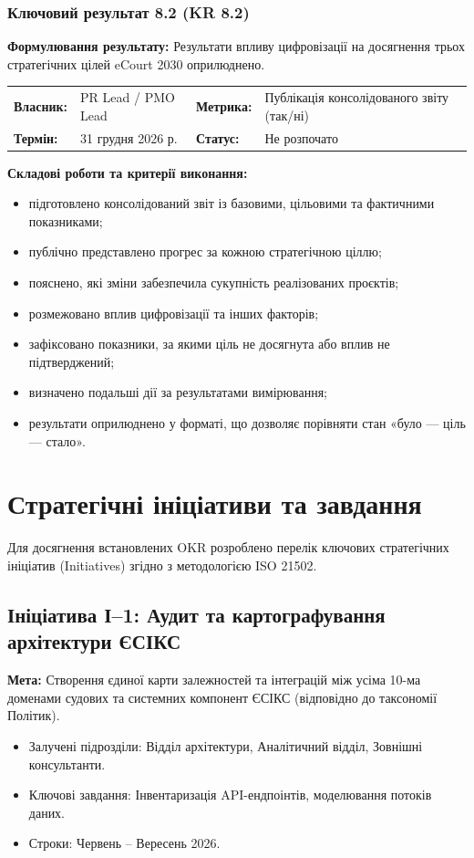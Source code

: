 \documentclass{article}
\begin{document}
\subsubsection{Ключовий результат 8.2 (KR 8.2)}

\textbf{Формулювання результату:} Результати впливу цифровізації на досягнення трьох стратегічних цілей eCourt 2030 оприлюднено.

\noindent\begin{tabular}{@{}p{2.2cm}p{4.5cm}p{2.2cm}p{4.5cm}@{}}
\toprule
\textbf{Власник:} & PR Lead / PMO Lead & \textbf{Метрика:} & Публікація консолідованого звіту (так/ні) \\
\textbf{Термін:} & 31 грудня 2026 р. & \textbf{Статус:} & Не розпочато \\
\bottomrule
\end{tabular}

\vspace{10pt}
\textbf{Складові роботи та критерії виконання:}
\begin{itemize}
    \item підготовлено консолідований звіт із базовими, цільовими та фактичними показниками;
    \item публічно представлено прогрес за кожною стратегічною ціллю;
    \item пояснено, які зміни забезпечила сукупність реалізованих проєктів;
    \item розмежовано вплив цифровізації та інших факторів;
    \item зафіксовано показники, за якими ціль не досягнута або вплив не підтверджений;
    \item визначено подальші дії за результатами вимірювання;
    \item результати оприлюднено у форматі, що дозволяє порівняти стан «було — ціль — стало».
\end{itemize}

\newpage
\section{Стратегічні ініціативи та завдання}
Для досягнення встановлених OKR розроблено перелік ключових стратегічних ініціатив (Initiatives) згідно з методологією ISO 21502.

\subsection{Ініціатива І--1: Аудит та картографування архітектури ЄСІКС}
\textbf{Мета:} Створення єдиної карти залежностей та інтеграцій між усіма 10-ма доменами судових та системних компонент ЄСІКС (відповідно до таксономії Політик).
\begin{itemize}
    \item Залучені підрозділи: Відділ архітектури, Аналітичний відділ, Зовнішні консультанти.
    \item Ключові завдання: Інвентаризація API-ендпоінтів, моделювання потоків даних.
    \item Строки: Червень -- Вересень 2026.
\end{itemize}
\end{document}
